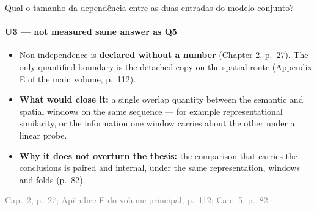 \documentclass{beamer}
\begin{document}
\begin{frame}[noframenumbering]{Qual o tamanho da dependência entre as duas entradas do modelo conjunto?}
    \framesubtitle{U3 --- not measured \textbullet{} same answer as Q5}
    \hypertarget{u3}{}
    \small
    \begin{itemize}\setlength{\itemsep}{0pt}\setlength{\parskip}{0pt}
        \item Non-independence is \textbf{declared without a number} (Chapter 2, p.~27). The only quantified boundary is the detached copy on the spatial route (Appendix E of the main volume, p.~112).
        \item \textbf{What would close it:} a single overlap quantity between the semantic and spatial windows on the same sequence --- for example representational similarity, or the information one window carries about the other under a linear probe.
        \item \textbf{Why it does not overturn the thesis:} the comparison that carries the conclusions is paired and internal, under the same representation, windows and folds (p.~82).
    \end{itemize}
    \vfill
    {\scriptsize
    \begin{minipage}[b]{0.775\linewidth}\raggedright\textcolor{gray}{Cap.~2, p.~27; Apêndice E do volume principal, p.~112; Cap.~5, p.~82.}\end{minipage}\hfill
    \begin{minipage}[b]{0.20\linewidth}\raggedleft \hyperlink{q5}{}\hyperlink{b0}{}\end{minipage}}
\end{frame}
\end{document}
